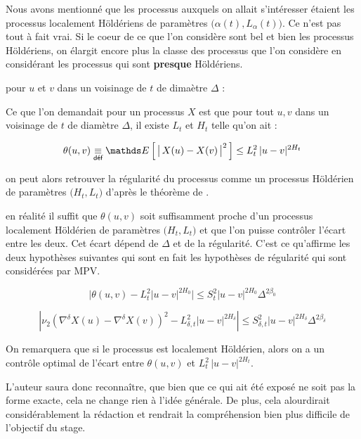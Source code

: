 Nous avons mentionné que les processus auxquels on allait s'intéresser étaient les processus localement Höldériens de paramètres $\bigl(\alpha(t), L_\alpha(t)\bigr)$. Ce n'est pas tout à fait vrai. Si le coeur de ce que l'on considère sont bel et bien les processus Höldériens, on élargit encore plus la classe des processus que l'on considère en considérant les processus qui sont \textbf{presque} Höldériens.


pour $u$ et $v$ dans un voisinage de $t$ de dimaètre $\Delta$ :


Ce que l'on demandait pour un processus $X$ est que pour tout $u,v$ dans un voisinage de $t$ de diamètre $\Delta$, il existe  $L_t$ et $H_t$ telle qu'on ait :

\begin{equation*}
	\theta(u,v) \isdef \esperance{ \bigl\vert \, X(u) - X(v) \, \bigr\vert^2 } \leq L_t^2 \, \vert u - v \vert^{2 H_t}
\end{equation*}

on peut alors retrouver la régularité du processus comme un processus Höldérien de paramètres $\bigl(H_t, L_t\bigr)$ d'après le théorème de .

en réalité il suffit que $\theta(u,v)$ soit suffisamment proche d'un processus localement Höldérien de paramètres $\bigl(H_t, L_t\bigr)$ et que l'on puisse contrôler l'écart entre les deux. Cet écart dépend de $\Delta$ et de la régularité. C'est ce qu'affirme les deux hypothèses suivantes qui sont en fait les hypothèses de régularité qui sont considérées par MPV\cite{maissoro-SmoothnessFTSweakDep}.

\begin{equation*}
	\bigl\vert \theta(u,v)-L_{t}^{2}|u-v|^{2H_{0}}\bigr\vert\leq S_{t}^{2}|u-v|^{2H_{0}}\Delta^{2\beta_{0}}
\end{equation*}

\cite[H6]{maissoro-SmoothnessFTSweakDep}

\begin{equation*}
	\left|\nu_{2}\left(\nabla^{\delta}X(u)-\nabla^{\delta}X(v)\right)^{2}-L_{\delta,t}^{2}|u-v|^{2H_\delta}\right|\leq S_{\delta,t}^{2}|u-v|^{2H_\delta}\Delta^{2\beta_{\delta}}
\end{equation*}


\cite[D1-7]{maissoro-SmoothnessFTSweakDep}


On remarquera que si le processus est localement Höldérien, alors on a un contrôle optimal de l'écart entre $\theta(u,v)$ et $L_t^2 \, \vert u - v \vert^{2 H_t}$.

L'auteur saura donc reconnaître, que bien que ce qui ait été exposé ne soit pas la forme exacte, cela ne change rien à l'idée générale. De plus, cela alourdirait considérablement la rédaction et rendrait la compréhension bien plus difficile de l'objectif du stage.
